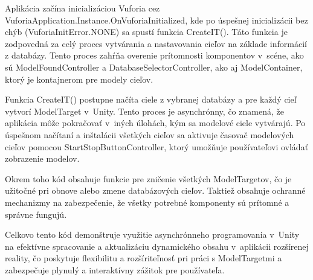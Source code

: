 Aplikácia začína inicializáciou Vuforia cez VuforiaApplication.Instance.OnVuforiaInitialized, kde po úspešnej inicializácii bez chýb (VuforiaInitError.NONE) sa spustí funkcia CreateIT(). Táto funkcia je zodpovedná za celý proces vytvárania a nastavovania cieľov na základe informácií z databázy. Tento proces zahŕňa overenie prítomnosti komponentov v~scéne, ako sú ModelFoundController a DatabaseSelectorController, ako aj ModelContainer, ktorý je kontajnerom pre modely cieľov.

Funkcia CreateIT() postupne načíta ciele z vybranej databázy a pre každý cieľ vytvorí ModelTarget v~Unity. Tento proces je asynchrónny, čo znamená, že aplikácia môže pokračovať v~iných úlohách, kým sa modelové ciele vytvárajú. Po úspešnom načítaní a inštalácii všetkých cieľov sa aktivuje časovač modelových cieľov pomocou StartStopButtonController, ktorý umožňuje používateľovi ovládať zobrazenie modelov.

Okrem toho kód obsahuje funkcie pre zničenie všetkých ModelTargetov, čo je užitočné pri obnove alebo zmene databázových cieľov. Taktiež obsahuje ochranné mechanizmy na zabezpečenie, že všetky potrebné komponenty sú prítomné a správne fungujú.

Celkovo tento kód demonštruje využitie asynchrónneho programovania v~Unity na efektívne spracovanie a aktualizáciu dynamického obsahu v~aplikácii rozšírenej reality, čo poskytuje flexibilitu a rozšíriteľnosť pri práci s ModelTargetmi a zabezpečuje plynulý a interaktívny zážitok pre používateľa.

